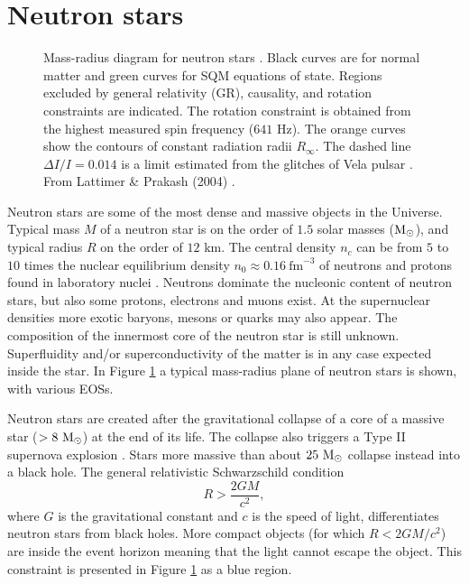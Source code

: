 \documentclass{wihuri}
\def\be{\begin{equation}}
\def\ee{\end{equation}}
\def\msun{{\rm M_{\odot}}}
\begin{document}
\section{Neutron stars}

\begin{figure}
\centerline{} 
\caption{Mass-radius diagram for neutron stars \cite{lattimer}. Black curves are for normal matter and green curves for SQM equations of state. Regions excluded by general relativity (GR), causality, and rotation constraints are indicated. The rotation constraint is obtained from the highest measured spin frequency ($641$ Hz). The orange curves show the contours of constant radiation radii $R_{\infty}$. The dashed line $\Delta I / I = 0.014$ is a limit estimated from the glitches of Vela pulsar \cite{lattimer2001}. From Lattimer \& Prakash (2004) \cite{lattimer}.}  
\label{fig:eos_mr}
\end{figure}

Neutron stars are some of the most dense and massive objects in the
Universe. Typical mass $M$ of a neutron star is on the order of $1.5$ solar masses ($\msun$), %
and typical radius $R$ on the order of $12$ km. The central density $n_{c}$ can be from $5$ to $10$ times the nuclear equilibrium density $n_{0} \approx 0.16 ~\mathrm{fm}^{-3}$ of neutrons and protons found in laboratory nuclei \cite{lattimer}. Neutrons dominate the nucleonic content of neutron stars, but also some protons, electrons and muons exist. At the supernuclear densities more exotic baryons, mesons or quarks may also appear. The composition of the innermost core of the neutron star is still unknown. Superfluidity and/or superconductivity of the matter %
is in any case expected inside the star. In Figure \ref{fig:eos_mr} a typical mass-radius plane of neutron stars is shown, with various EOSs.

 
Neutron stars are created after the gravitational collapse of a core of a
massive star ($>8~\msun$) at the end of its life. The collapse also triggers a Type II supernova explosion \cite{lattimer}. Stars more massive than about $25 ~\msun$ collapse instead into a black hole. The general relativistic Schwarzschild condition 
\be \label{eq:schw_cond}
 R > \frac{2GM}{c^{2}},
\ee 
where $G$ is the gravitational constant and $c$ is the speed of light, %
differentiates neutron stars from black holes. More compact objects (for which $R < 2GM/c^{2}$) are inside the event horizon meaning that the light cannot escape the object. This constraint is presented in Figure \ref{fig:eos_mr} as a blue region.
\end{document}
